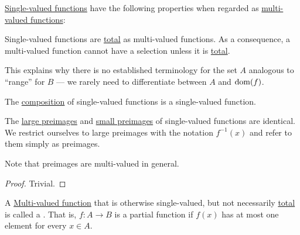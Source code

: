 \begin{proposition}\label{thm:def:function}
  \hyperref[def:function]{Single-valued functions} have the following properties when regarded as \hyperref[def:multi_valued_function]{multi-valued functions}:
  \begin{thmenum}
     Single-valued functions are \hyperref[def:multi_valued_function/total]{total} as multi-valued functions. As a consequence, a multi-valued function cannot have a selection unless it is \hyperref[def:multi_valued_function/total]{total}.

    This explains why there is no established terminology for the set \( A \) analogous to \enquote{range} for \( B \) --- we rarely need to differentiate between \( A \) and \( \operatorname{dom}(f) \).

     The \hyperref[def:multi_valued_function/composition]{composition} of single-valued functions is a single-valued function.

     The \hyperref[def:multi_valued_function/large_preimage]{large preimages} and \hyperref[def:multi_valued_function/small_preimage]{small preimages} of single-valued functions are identical. We restrict ourselves to large preimages with the notation \( f^{-1}(x) \) and refer to them simply as preimages.

    Note that preimages are multi-valued in general.
  \end{thmenum}
\end{proposition}
\begin{proof}
  Trivial.
\end{proof}

\begin{definition}\label{def:partial_function}
  A \hyperref[def:multi_valued_function]{Multi-valued function} that is otherwise single-valued, but not necessarily \hyperref[def:multi_valued_function/total]{total} is called a . That is, \( f: A \to B \) is a partial function if \( f(x) \) has at most one element for every \( x \in A \).
\end{definition}


